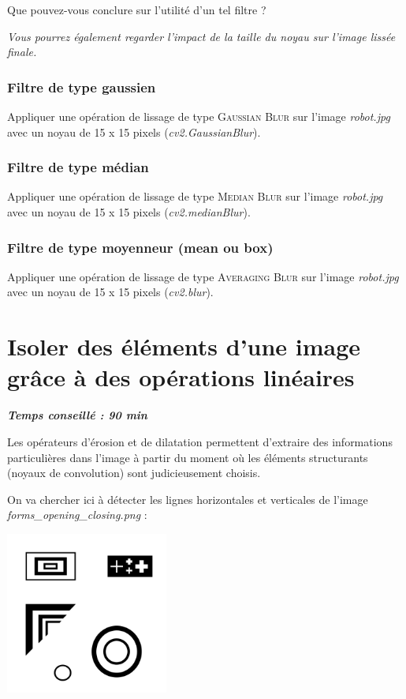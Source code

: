 \documentclass[a4paper,11pt,titlepage]{article} %
\begin{document}
\Quest Que pouvez-vous conclure sur l'utilité d'un tel filtre ?

\textit{Vous pourrez également regarder l'impact de la taille du noyau sur l'image lissée finale.}


\subsubsection{Filtre de type gaussien}

\Manip Appliquer une opération de lissage de type \textsc{Gaussian Blur} sur l'image \textsl{robot.jpg} avec un noyau de 15 x 15 pixels (\textsl{cv2.GaussianBlur}).

\subsubsection{Filtre de type médian}

\Manip Appliquer une opération de lissage de type \textsc{Median Blur} sur l'image \textsl{robot.jpg} avec un noyau de 15 x 15 pixels (\textsl{cv2.medianBlur}).

\subsubsection{Filtre de type moyenneur (mean ou box)}

\Manip Appliquer une opération de lissage de type \textsc{Averaging Blur} sur l'image \textsl{robot.jpg} avec un noyau de 15 x 15 pixels (\textsl{cv2.blur}).


\newpage	
\section{Isoler des éléments d'une image grâce à des opérations linéaires}

\begin{center} \textbf{\textit{Temps conseillé : 90 min}} \end{center}

Les opérateurs d'érosion et de dilatation permettent d'extraire des informations particulières dans l'image à partir du moment où les éléments structurants (noyaux de convolution) sont judicieusement choisis.

On va chercher ici à détecter les lignes horizontales et verticales de l'image \textsl{\textit{forms\_opening\_closing.png}} :

\begin{center}
	\includegraphics[width=0.4\textwidth]{images/forms_opening_closing_inv.png}
\end{center}
\end{document}
